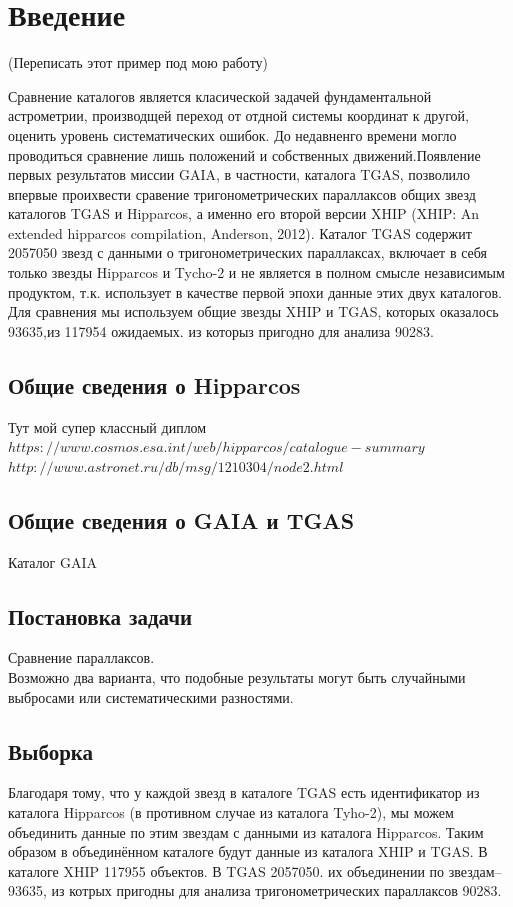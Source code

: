 \documentclass[14pt]{article} %
\begin{document}
 
\section{Введение}\label{introduction}

(Переписать этот пример под мою работу)


Сравнение каталогов является класической задачей фундаментальной\\ астрометрии, производщей переход от отдной системы координат к другой, оценить уровень систематических ошибок. До недавненго времени могло проводиться сравнение лишь положений и собственных движений.Появление первых результатов миссии GAIA, в частности, каталога TGAS, позволило впервые проихвести сравение тригонометрических параллаксов общих звезд каталогов TGAS и  Hipparcos, а именно его второй версии XHIP (XHIP: An extended hipparcos compilation, Anderson, 2012). Каталог TGAS содержит 2057050 звезд с данными о тригонометрических параллаксах, включает в себя только звезды Hipparcos и Tycho-2  и не является в полном смысле независимым продуктом, т.к. использует в качестве первой эпохи данные этих двух каталогов. Для сравнения мы используем общие звезды XHIP  и TGAS, которых оказалось 93635,из 117954 ожидаемых. из которыз пригодно для анализа 90283.

\subsection{Общие сведения о Hipparcos}\label{sub:smthhip}
 Тут мой супер классный диплом
$https://www.cosmos.esa.int/web/hipparcos/catalogue-summary$
$http://www.astronet.ru/db/msg/1210304/node2.html$

\subsection{Общие сведения о GAIA и TGAS}\label{sub:smthgaia}
Каталог GAIA
		
\subsection{Постановка задачи}\label{sub:smthzd}
	Сравнение параллаксов.\\
Возможно два варианта, что подобные результаты могут быть случайными выбросами или систематическими разностями.

\subsection{Выборка}\label{sub:smthzd}
Благодаря тому, что у каждой звезд в каталоге TGAS есть идентификатор из каталога Hipparcos (в противном случае из каталога Tyho-2), мы можем объединить данные по этим звездам с данными из каталога Hipparcos. Таким образом в объединённом каталоге будут данные из каталога XHIP и TGAS. В каталоге XHIP 117955 объектов. В TGAS 2057050. их объединении по звездам-- 93635, из котрых пригодны для анализа тригонометрических параллаксов  90283.
\end{document}
